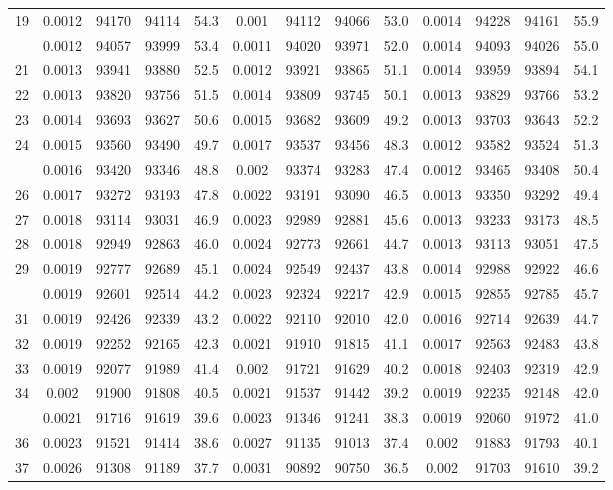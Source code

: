 \documentclass[
  14pt,
]{article}
\begin{document}
\begin{longtable}[t]{lcccccccccccc}
19 & 0.0012 & 94170 & 94114 & 54.3 & 0.001 & 94112 & 94066 & 53.0 & 0.0014 & 94228 & 94161 & 55.9\\
\addlinespace
20 & 0.0012 & 94057 & 93999 & 53.4 & 0.0011 & 94020 & 93971 & 52.0 & 0.0014 & 94093 & 94026 & 55.0\\
21 & 0.0013 & 93941 & 93880 & 52.5 & 0.0012 & 93921 & 93865 & 51.1 & 0.0014 & 93959 & 93894 & 54.1\\
22 & 0.0013 & 93820 & 93756 & 51.5 & 0.0014 & 93809 & 93745 & 50.1 & 0.0013 & 93829 & 93766 & 53.2\\
23 & 0.0014 & 93693 & 93627 & 50.6 & 0.0015 & 93682 & 93609 & 49.2 & 0.0013 & 93703 & 93643 & 52.2\\
24 & 0.0015 & 93560 & 93490 & 49.7 & 0.0017 & 93537 & 93456 & 48.3 & 0.0012 & 93582 & 93524 & 51.3\\
\addlinespace
25 & 0.0016 & 93420 & 93346 & 48.8 & 0.002 & 93374 & 93283 & 47.4 & 0.0012 & 93465 & 93408 & 50.4\\
26 & 0.0017 & 93272 & 93193 & 47.8 & 0.0022 & 93191 & 93090 & 46.5 & 0.0013 & 93350 & 93292 & 49.4\\
27 & 0.0018 & 93114 & 93031 & 46.9 & 0.0023 & 92989 & 92881 & 45.6 & 0.0013 & 93233 & 93173 & 48.5\\
28 & 0.0018 & 92949 & 92863 & 46.0 & 0.0024 & 92773 & 92661 & 44.7 & 0.0013 & 93113 & 93051 & 47.5\\
29 & 0.0019 & 92777 & 92689 & 45.1 & 0.0024 & 92549 & 92437 & 43.8 & 0.0014 & 92988 & 92922 & 46.6\\
\addlinespace
30 & 0.0019 & 92601 & 92514 & 44.2 & 0.0023 & 92324 & 92217 & 42.9 & 0.0015 & 92855 & 92785 & 45.7\\
31 & 0.0019 & 92426 & 92339 & 43.2 & 0.0022 & 92110 & 92010 & 42.0 & 0.0016 & 92714 & 92639 & 44.7\\
32 & 0.0019 & 92252 & 92165 & 42.3 & 0.0021 & 91910 & 91815 & 41.1 & 0.0017 & 92563 & 92483 & 43.8\\
33 & 0.0019 & 92077 & 91989 & 41.4 & 0.002 & 91721 & 91629 & 40.2 & 0.0018 & 92403 & 92319 & 42.9\\
34 & 0.002 & 91900 & 91808 & 40.5 & 0.0021 & 91537 & 91442 & 39.2 & 0.0019 & 92235 & 92148 & 42.0\\
\addlinespace
35 & 0.0021 & 91716 & 91619 & 39.6 & 0.0023 & 91346 & 91241 & 38.3 & 0.0019 & 92060 & 91972 & 41.0\\
36 & 0.0023 & 91521 & 91414 & 38.6 & 0.0027 & 91135 & 91013 & 37.4 & 0.002 & 91883 & 91793 & 40.1\\
37 & 0.0026 & 91308 & 91189 & 37.7 & 0.0031 & 90892 & 90750 & 36.5 & 0.002 & 91703 & 91610 & 39.2\\

\end{longtable}
\end{document}

